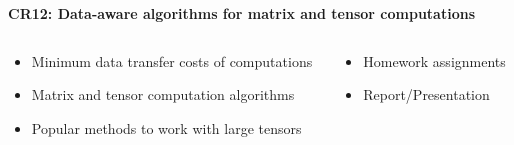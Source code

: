 \documentclass[9pt]{beamer}
\begin{document}
\begin{frame}{{\textbf{CR12: Data-aware algorithms for matrix and tensor computations}}}
%		
%		
%		

\vfill

\begin{small}
  \begin{columns}
  \begin{column}{0.65\textwidth}
  \begin{block}{{\color{blue}{Contents}}}
    \begin{itemize}
    	\item Minimum data transfer costs of computations
    	\item Matrix and tensor computation algorithms
    	\item Popular methods to work with large tensors
    \end{itemize}
  \end{block}
    \end{column}
  \begin{column}{0.35\textwidth}
  \begin{block}{{\color{blue}{Evaluation}}}
    \begin{itemize}
    \item Homework assignments
   \item Report/Presentation 
    \end{itemize}
  \end{block}
    \end{column}
    \end{columns}
    \end{small}
\end{frame}

\vfill  
\end{document}
